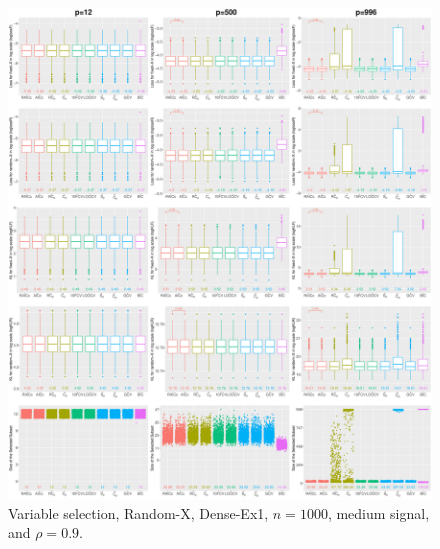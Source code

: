 \begin{figure}[!ht]
\centering
\includegraphics[width=\textwidth]{figures/supplement/randomx/subset_selection/Dense-Ex1_n1000_msnr_rho09.eps}
\caption{Variable selection, Random-X, Dense-Ex1, $n=1000$, medium signal, and $\rho=0.9$.}
\end{figure}
\clearpage
